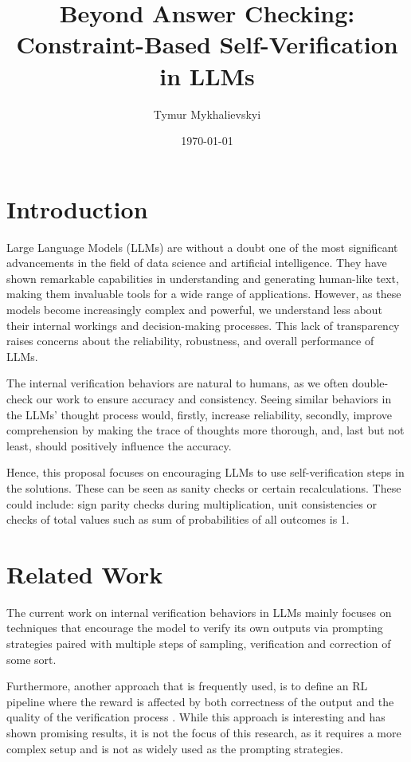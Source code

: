 \documentclass{article}
\title{Beyond Answer Checking: Constraint-Based Self-Verification in LLMs}
\author{Tymur Mykhalievskyi}
\date{\today}
\begin{document}
\maketitle

\section{Introduction}
Large Language Models (LLMs) are without a doubt one of the most significant advancements in the field of data science and artificial intelligence. They have shown remarkable capabilities in understanding and generating human-like text, making them invaluable tools for a wide range of applications. However, as these models become increasingly complex and powerful, we understand less about their internal workings and decision-making processes. This lack of transparency raises concerns about the reliability, robustness, and overall performance of LLMs. 

The internal verification behaviors are natural to humans, as we often double-check our work to ensure accuracy and consistency. Seeing similar behaviors in the LLMs' thought process would, firstly, increase reliability, secondly, improve comprehension by making the trace of thoughts more thorough, and, last but not least, should positively influence the accuracy.

Hence, this proposal focuses on encouraging LLMs to use self-verification steps in the solutions. These can be seen as sanity checks or certain recalculations. These could include: sign parity checks during multiplication, unit consistencies or checks of total values such as sum of probabilities of all outcomes is 1.

\section{Related Work}
The current work on internal verification behaviors in LLMs mainly focuses on techniques that encourage the model to verify its own outputs via prompting strategies paired with multiple steps of sampling, verification and correction of some sort. 

Furthermore, another approach that is frequently used, is to define an RL pipeline where the reward is affected by both correctness of the output and the quality of the verification process \citep{revise,cai2026smartsnapproactiveevidenceseeking,zhang2025incentivizingllmsselfverifyanswers}. While this approach is interesting and has shown promising results, it is not the focus of this research, as it requires a more complex setup and is not as widely used as the prompting strategies.
\end{document}

